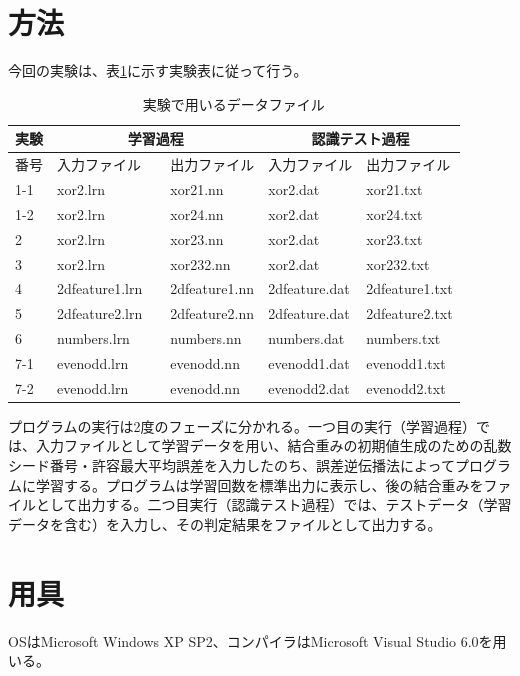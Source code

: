 \documentclass[final]{jarticle}[2012/05/15]
\begin{document}
\section{方法}
今回の実験は、表\ref{datafiles}に示す実験表に従って行う。\par
\begin{table}[h]
  \begin{center}
    \caption{実験で用いるデータファイル} \label{datafiles}
    \begin{tabular}{|l|l|l|l|l|}\hline
      実験 & \multicolumn{2}{|c|}{学習過程} & \multicolumn{2}{|c|}{認識テスト過程} \\ \hline
      番号 & 入力ファイル &　出力ファイル & 入力ファイル & 出力ファイル \\ \hline
      1-1 & xor2.lrn       &　xor21.nn      & xor2.dat      & xor21.txt \\ \hline
      1-2 & xor2.lrn       &　xor24.nn      & xor2.dat      & xor24.txt \\ \hline
      2   & xor2.lrn       &　xor23.nn      & xor2.dat      & xor23.txt \\ \hline
      3   & xor2.lrn       &　xor232.nn     & xor2.dat      & xor232.txt \\ \hline
      4   & 2dfeature1.lrn &　2dfeature1.nn & 2dfeature.dat & 2dfeature1.txt \\ \hline
      5   & 2dfeature2.lrn &　2dfeature2.nn & 2dfeature.dat & 2dfeature2.txt \\ \hline
      6   & numbers.lrn    &　numbers.nn    & numbers.dat   & numbers.txt \\ \hline
      7-1 & evenodd.lrn    &　evenodd.nn    & evenodd1.dat  & evenodd1.txt \\ \hline
      7-2 & evenodd.lrn    &　evenodd.nn    & evenodd2.dat  & evenodd2.txt \\ \hline
    \end{tabular}
  \end{center}
\end{table}
プログラムの実行は2度のフェーズに分かれる。一つ目の実行（学習過程）では、入力ファイルとして学習データを用い、結合重みの初期値生成のための乱数シード番号・許容最大平均誤差を入力したのち、誤差逆伝播法によってプログラムに学習する。プログラムは学習回数を標準出力に表示し、後の結合重みをファイルとして出力する。二つ目実行（認識テスト過程）では、テストデータ（学習データを含む）を入力し、その判定結果をファイルとして出力する。\par
\section{用具}
OSはMicrosoft Windows XP SP2、コンパイラはMicrosoft Visual Studio 6.0を用いる。\par
\pagebreak
\end{document}

